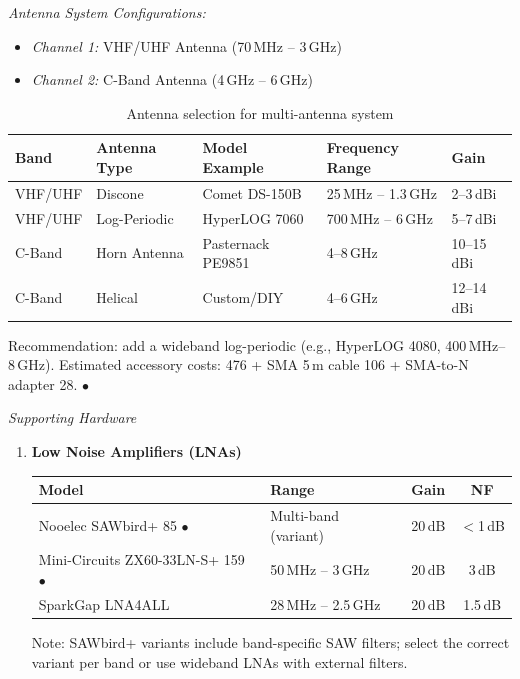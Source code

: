 \documentclass[11pt]{report}
\newcommand{\gc}[1]{\textcolor[rgb]{1.00,0.00,0.00}{#1}} %
\newcommand{\blue}[1]{\textcolor[rgb]{0.00,0.00,1.00}{#1}} %
\begin{document}
\begin{description}
\bigskip

\textit{Antenna System Configurations:}
\begin{itemize}
    \item \textit{Channel 1:} VHF/UHF Antenna (70\,MHz -- 3\,GHz)
    \item \textit{Channel 2:} C-Band Antenna (4\,GHz -- 6\,GHz)
\end{itemize}

\begin{table}[h]
    \centering
    \begin{tabular}{@{}lllll@{}}
        \toprule
        \textbf{Band} & \textbf{Antenna Type} & \textbf{Model Example} & \textbf{Frequency Range} & \textbf{Gain} \\ 
        \midrule
        VHF/UHF & Discone & Comet DS-150B & 25\,MHz -- 1.3\,GHz & 2--3\,dBi \\
        VHF/UHF & Log-Periodic & HyperLOG 7060 & 700\,MHz -- 6\,GHz & 5--7\,dBi \\
        C-Band & Horn Antenna & Pasternack PE9851 & 4--8\,GHz & 10--15\,dBi \\
        C-Band & Helical & Custom/DIY & 4--6\,GHz & 12--14\,dBi \\
        \bottomrule
    \end{tabular}
    \caption{Antenna selection for multi-antenna system}
\end{table}

\gc{Recommendation:} add a wideband log-periodic (e.g., HyperLOG 4080, 400\,MHz--8\,GHz). Estimated accessory costs: \blue{476} + SMA 5\,m cable \blue{106} + SMA-to-N adapter \blue{28}. \href{https://www.google.com}{\gc{$\bullet$}}

\newpage

\textit{Supporting Hardware}

\begin{enumerate}[label=\roman*)]
    \item \textbf{Low Noise Amplifiers (LNAs)}
    \begin{table}[!h]
        \centering
        \small
        \begin{tabular}{llcc}
            \toprule
            \textbf{Model} & \textbf{Range} & \textbf{Gain} & \textbf{NF} \\ 
            \midrule
            Nooelec SAWbird+ \blue{85} \href{https://www.amazon.com/Nooelec-SAWbird-ADS-B-Dual-Channel-Applications/dp/B0CBD1KK3G}{\gc{$\bullet$}} & Multi-band (variant) & 20\,dB & $<$1\,dB \\
            Mini-Circuits ZX60-33LN-S+ \blue{159} \href{https://www.ebay.com/itm/136591156802}{\gc{$\bullet$}} & 50\,MHz -- 3\,GHz & 20\,dB & 3\,dB \\
            SparkGap LNA4ALL & 28\,MHz -- 2.5\,GHz & 20\,dB & 1.5\,dB \\
            \bottomrule
        \end{tabular}
    \end{table}
    \smallskip
    Note: SAWbird+ variants include band-specific SAW filters; select the correct variant per band or use wideband LNAs with external filters.
    

\end{enumerate}
\end{description}
\end{document}
